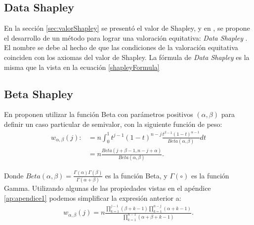 \subsection*{Data Shapley}
En la sección \ref{sec:valorShapley} se presentó
el valor de Shapley, y en \cite{shapleyValue}, se propone
el desarrollo de un método para lograr una valoración equitativa:
\textit{Data Shapley} . El nombre se debe al
hecho de que las condiciones de la valoración equitativa coinciden
con los axiomas del valor de Shapley. La fórmula de \textit{Data Shapley} es
la misma que la vista en la ecuación \ref{shapleyFormula}





\subsection*{Beta Shapley}
En \cite{betaShapley} proponen  utilizar la función Beta con
parámetros positivos $(\alpha,\beta)$ para definir
un caso particular de semivalor, con la siguiente función de peso:
\begin{equation*}
  \begin{split}
    w_{\alpha, \beta}(j) :&= n \int_{0}^{1} t^{j-1}(1-t)^{n-j}
    \frac{t^{\beta-1}(1-t)^{\alpha-1}}{Beta(\alpha,\beta)}dt\\
    &= n\frac{Beta(j+\beta-1, n-j+\alpha)}
  {Beta(\alpha,\beta)}.
  \end{split}
\end{equation*}
 
Donde $Beta(\alpha,\beta) = \frac{\Gamma(\alpha)\Gamma(\beta)}
{\Gamma(\alpha+\beta)}$ es la función Beta, y $\Gamma(\circ)$ es
la función Gamma. Utilizando algunas de las propiedades vistas
en el apéndice \ref{ap:apendice1} podemos simplificar la expresión
anterior a: 
\begin{equation*}
  \begin{split}
  \label{eq:pesoBeta}
  w_{\alpha, \beta}(j) = n\frac{\prod_{k=1}^{j-1}(\beta+k-1)
  \prod_{k=1}^{n-j}(\alpha+k-1)}
  {\prod_{k=1}^{n-1}(\alpha+\beta+k-1)}.
  \end{split}
\end{equation*}

